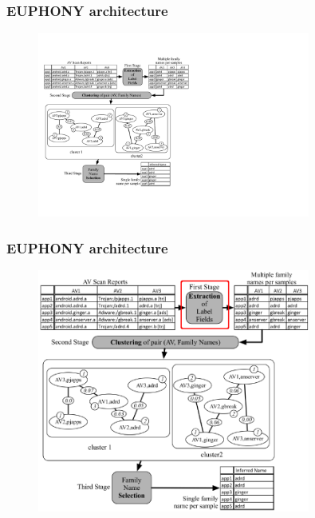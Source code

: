 \begin{frame}
    \frametitle{EUPHONY architecture}

    \begin{figure}
        \vspace{-5pt}
        \includegraphics[width=0.8\textwidth]{figures/euphony/architecture.pdf}
    \end{figure}

\end{frame}

\begin{frame}
    \frametitle{EUPHONY architecture}

    \begin{figure}
        \vspace{-5pt}
        \includegraphics[width=0.8\textwidth]{figures/euphony/architecture-first.pdf}
    \end{figure}

\end{frame}

